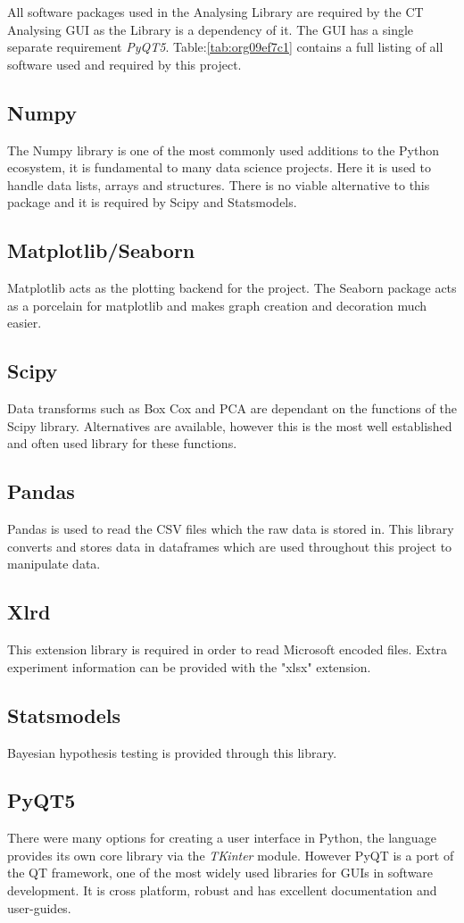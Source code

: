 \documentclass[11pt]{report}
\begin{document}
All software packages used in the Analysing Library are required by the CT Analysing GUI as the Library is a dependency of it. The GUI has a single separate requirement \emph{PyQT5}.
Table:\ref{tab:org09ef7c1} contains a full listing of all software used and required by this project.
\subsection{Numpy}
\label{sec:org39a7c01}
The Numpy library is one of the most commonly used additions to the Python ecosystem, it is fundamental to many data science projects. Here it is used to handle data lists, arrays and structures. There is no viable alternative to this package and it is required by Scipy and Statsmodels.
\subsection{Matplotlib/Seaborn}
\label{sec:org0d5823f}
Matplotlib acts as the plotting backend for the project. The Seaborn package acts as a porcelain for matplotlib and makes graph creation and decoration much easier.
\subsection{Scipy}
\label{sec:orgaacc530}
Data transforms such as Box Cox and PCA are dependant on the functions of the Scipy library. Alternatives are available, however this is the most well established and often used library for these functions.
\subsection{Pandas}
\label{sec:orgc87e1d1}
Pandas is used to read the CSV files which the raw data is stored in. This library converts and stores data in dataframes which are used throughout this project to manipulate data.
\subsection{Xlrd}
\label{sec:org671c626}
This extension library is required in order to read Microsoft encoded files. Extra experiment information can be provided with the "xlsx" extension.
\subsection{Statsmodels}
\label{sec:org5d32b33}
Bayesian hypothesis testing is provided through this library.
\subsection{PyQT5}
\label{sec:org04cb526}
There were many options for creating a user interface in Python, the language provides its own core library via the \emph{TKinter} module. However PyQT is a port of the QT framework, one of the most widely used libraries for GUIs in software development. It is cross platform, robust and has excellent documentation and user-guides.
\end{document}
